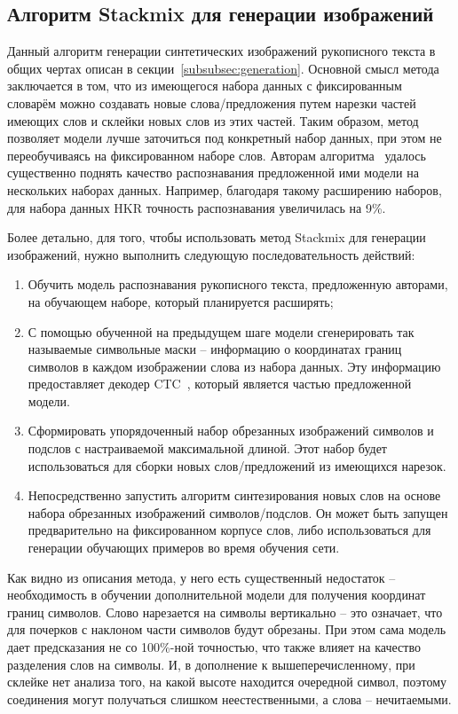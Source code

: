 \subsection{Алгоритм Stackmix для генерации изображений}
\label{subsec:stackmix}

Данный алгоритм генерации синтетических изображений рукописного текста в общих чертах описан в секции~\ref{subsubsec:generation}.
Основной смысл метода заключается в том, что из имеющегося набора данных с фиксированным словарём можно создавать новые слова/предложения
путем нарезки частей имеющих слов и склейки новых слов из этих частей.
Таким образом, метод позволяет модели лучше заточиться под конкретный набор данных, при этом не переобучиваясь на фиксированном наборе слов.
Авторам алгоритма~\cite{shonenkov2021stackmix} удалось существенно поднять качество распознавания предложенной ими модели
на нескольких наборах данных.
Например, благодаря такому расширению наборов, для набора данных HKR точность распознавания увеличилась на 9\%.

Более детально, для того, чтобы использовать метод Stackmix для генерации изображений, нужно выполнить следующую последовательность действий:
\begin{enumerate}
    \item Обучить модель распознавания рукописного текста, предложенную авторами, на обучающем наборе, который планируется расширять;
    \item С помощью обученной на предыдущем шаге модели сгенерировать так называемые символьные маски -- информацию о координатах границ символов в каждом изображении слова из набора данных.
    Эту информацию предоставляет декодер CTC~\cite{graves2006connectionist}, который является частью предложенной модели.
    \item Сформировать упорядоченный набор обрезанных изображений символов и подслов с настраиваемой максимальной длиной.
    Этот набор будет использоваться для сборки новых слов/предложений из имеющихся нарезок.
    \item Непосредственно запустить алгоритм синтезирования новых слов на основе набора обрезанных изображений символов/подслов.
    Он может быть запущен предварительно на фиксированном корпусе слов, либо использоваться для генерации обучающих примеров во время обучения сети.
\end{enumerate}

Как видно из описания метода, у него есть существенный недостаток -- необходимость в обучении дополнительной модели для получения координат границ символов.
Слово нарезается на символы вертикально -- это означает, что для почерков с наклоном части символов будут обрезаны.
При этом сама модель дает предсказания не со 100\%-ной точностью, что также влияет на качество разделения слов на символы.
И, в дополнение к вышеперечисленному, при склейке нет анализа того, на какой высоте находится очередной символ, поэтому соединения
могут получаться слишком неестественными, а слова -- нечитаемыми.

